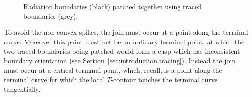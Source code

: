\begin{figure}
  \newcommand*{\subfigurewidth}{0.36\textwidth}
  \centering
    \hspace*{\fill}
  \begin{subfigure}[t]{\subfigurewidth}
  \end{subfigure}
    \hfill
  \begin{subfigure}[t]{\subfigurewidth}
  \end{subfigure}
    \hspace*{\fill}
  \caption{
    Radiation boundaries (black) patched together
    using traced boundaries (grey).
  }
  \label{fig:cosine_simple-traced-boundaries-patched}
\end{figure}

\begin{figure}
\end{figure}

To avoid the non-convex spikes,
the join must occur at a point along the terminal curve.
Moreover this point must not be an ordinary terminal point,
at which the two traced boundaries being patched
would form a cusp which has inconsistent boundary orientation
(see Section~\ref{sec:introduction.tracing}).
Instead the join must occur at a critical terminal point,
which, recall, is a point along the terminal curve
for which the local $T$-contour touches the terminal curve tangentially.

